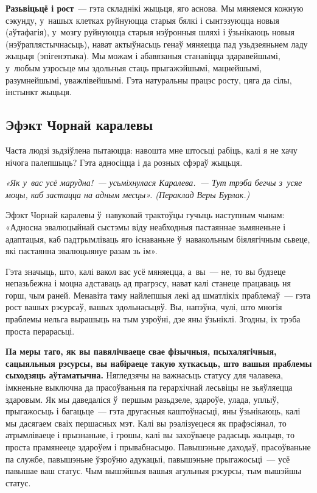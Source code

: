 \textbf{Разьвіцьцё і рост}~--- гэта складнікі жыцьця, яго аснова. Мы мяняемся кожную сэкунду, у~нашых клетках руйнуюцца старыя бялкі і сынтэзуюцца новыя (аўтафагія), у~мозгу руйнуюцца старыя нэўронныя шляхі і ўзьнікаюць новыя (нэўраплястычнасьць), нават актыўнасьць генаў мяняецца пад узьдзеяньнем ладу жыцьця (эпігенэтыка). Мы можам і абавязаныя станавіцца здаравейшымі, у~любым узросьце мы здольныя стаць прыгажэйшымі, мацнейшымі, разумнейшымі, уважлівейшымі. Гэта натуральны працэс росту, цяга да сілы, інстынкт жыцьця.


\subsection*{Эфэкт Чорнай каралевы}

Часта людзі зьдзіўлена пытаюцца: навошта мне штосьці рабіць, калі я не хачу нічога палепшыць? Гэта адносіцца і да розных сфэраў жыцьця. 

\emph{«Як у~вас усё марудна!~--- усьміхнулася Каралева.~--- Тут трэба бегчы з~усяе моцы, каб застацца на адным месцы». (Пераклад Веры Бурлак.)}

Эфэкт Чорнай каралевы ў~навуковай трактоўцы гучыць наступным чынам: «Адносна эвалюцыйнай сыстэмы віду неабходныя пастаяннае зьмяненьне і адаптацыя, каб падтрымліваць яго існаваньне ў~навакольным біялягічным сьвеце, які пастаянна эвалюцыянуе разам зь ім».

Гэта значыць, што, калі вакол вас усё мяняецца, а~вы~--- не, то вы будзеце непазьбежна і моцна адставаць ад прагрэсу, нават калі станеце працаваць ня горш, чым раней. Менавіта таму найлепшыя лекі ад шматлікіх праблемаў~--- гэта рост вашых рэсурсаў, вашых здольнасьцяў. Вы, напэўна, чулі, што многія праблемы нельга вырашыць на тым узроўні, дзе яны ўзьніклі. Згодны, іх трэба проста перарасьці. 

\textbf{Па меры таго, як вы павялічваеце свае фізычныя, псыхалягічныя, сацыяльныя рэсурсы, вы набіраеце такую хуткасьць, што вашыя праблемы сыходзяць аўтаматычна.} Нягледзячы на важнасьць статусу для чалавека, імкненьне выключна да прасоўваньня па герархічнай лесьвіцы не зьяўляецца здаровым. Як мы даведаліся ў~першым разьдзеле, здароўе, улада, уплыў, прыгажосьць і багацьце~--- гэта другасныя каштоўнасьці, яны ўзьнікаюць, калі мы дасягаем сваіх першасных мэт. Калі вы рэалізуецеся як прафэсіянал, то атрымліваеце і прызнаньне, і грошы, калі вы захоўваеце радасьць жыцьця, то проста прамянееце здароўем і прывабнасьцю. Павышэньне даходаў, прасоўваньне па службе, павышэньне ўзроўню адукацыі, павышэньне прыгажосьці~--- усё павышае ваш статус. Чым вышэйшыя вашыя агульныя рэсурсы, тым вышэйшы статус.

